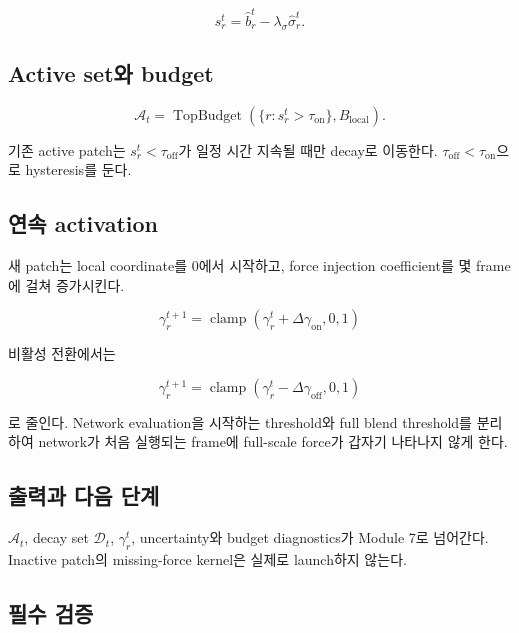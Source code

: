 \documentclass[11pt,a4paper]{article}
\newcommand{\clamp}{\operatorname{clamp}}
\begin{document}
\begin{equation}
  s_r^t
  =
  \widehat b_r^t
  -\lambda_\sigma\widehat\sigma_r^t.
\end{equation}

\subsection*{Active set와 budget}

\begin{equation}
  \mathcal A_t
  =
  \operatorname{TopBudget}
  \left(
    \{r:s_r^t>\tau_{\mathrm{on}}\},
    B_{\mathrm{local}}
  \right).
\end{equation}

기존 active patch는 \(s_r^t<\tau_{\mathrm{off}}\)가 일정 시간 지속될 때만 decay로 이동한다.
\(\tau_{\mathrm{off}}<\tau_{\mathrm{on}}\)으로 hysteresis를 둔다.

\subsection*{연속 activation}

새 patch는 local coordinate를 0에서 시작하고,
force injection coefficient를 몇 frame에 걸쳐 증가시킨다.

\begin{equation}
  \gamma_r^{t+1}
  =
  \clamp(\gamma_r^t+\Delta\gamma_{\mathrm{on}},0,1)
\end{equation}

비활성 전환에서는

\begin{equation}
  \gamma_r^{t+1}
  =
  \clamp(\gamma_r^t-\Delta\gamma_{\mathrm{off}},0,1)
\end{equation}

로 줄인다.
Network evaluation을 시작하는 threshold와 full blend threshold를 분리하여
network가 처음 실행되는 frame에 full-scale force가 갑자기 나타나지 않게 한다.

\subsection*{출력과 다음 단계}

\(\mathcal A_t\), decay set \(\mathcal D_t\), \(\gamma_r^t\),
uncertainty와 budget diagnostics가 Module 7로 넘어간다.
Inactive patch의 missing-force kernel은 실제로 launch하지 않는다.

\subsection*{필수 검증}
\end{document}

